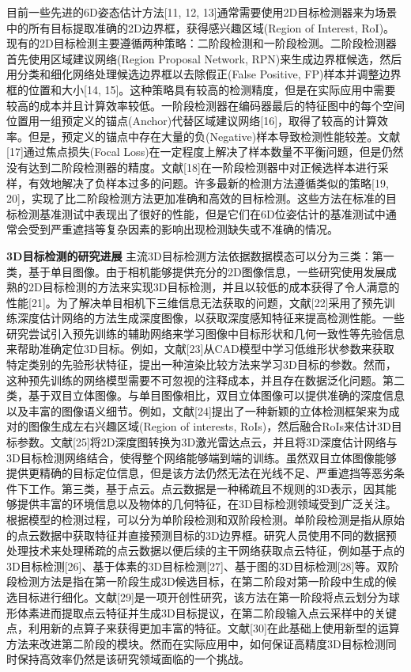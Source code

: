 \documentclass[12pt]{article}
\begin{document}
目前一些先进的6D姿态估计方法[11, 12, 13]通常需要使用2D目标检测器来为场景中的所有目标提取准确的2D边界框，获得感兴趣区域(Region of Interest, RoI)。现有的2D目标检测主要遵循两种策略：二阶段检测和一阶段检测。二阶段检测器首先使用区域建议网络(Region Proposal Network, RPN)来生成边界框候选，然后用分类和细化网络处理候选边界框以去除假正(False Positive, FP)样本并调整边界框的位置和大小[14, 15]。这种策略具有较高的检测精度，但是在实际应用中需要较高的成本并且计算效率较低。一阶段检测器在编码器最后的特征图中的每个空间位置用一组预定义的锚点(Anchor)代替区域建议网络[16]，取得了较高的计算效率。但是，预定义的锚点中存在大量的负(Negative)样本导致检测性能较差。文献[17]通过焦点损失(Focal Loss)在一定程度上解决了样本数量不平衡问题，但是仍然没有达到二阶段检测器的精度。文献[18]在一阶段检测器中对正候选样本进行采样，有效地解决了负样本过多的问题。许多最新的检测方法遵循类似的策略[19, 20]，实现了比二阶段检测方法更加准确和高效的目标检测。这些方法在标准的目标检测基准测试中表现出了很好的性能，但是它们在6D位姿估计的基准测试中通常会受到严重遮挡等复杂因素的影响出现检测缺失或不准确的情况。

\textbf{3D目标检测的研究进展}
主流3D目标检测方法依据数据模态可以分为三类：第一类，基于单目图像。由于相机能够提供充分的2D图像信息，一些研究使用发展成熟的2D目标检测的方法来实现3D目标检测，并且以较低的成本获得了令人满意的性能[21]。为了解决单目相机下三维信息无法获取的问题，文献[22]采用了预先训练深度估计网络的方法生成深度图像，以获取深度感知特征来提高检测性能。一些研究尝试引入预先训练的辅助网络来学习图像中目标形状和几何一致性等先验信息来帮助准确定位3D目标。例如，文献[23]从CAD模型中学习低维形状参数来获取特定类别的先验形状特征，提出一种渲染比较方法来学习3D目标的参数。然而，这种预先训练的网络模型需要不可忽视的注释成本，并且存在数据泛化问题。第二类，基于双目立体图像。与单目图像相比，双目立体图像可以提供准确的深度信息以及丰富的图像语义细节。例如，文献[24]提出了一种新颖的立体检测框架来为成对的图像生成左右兴趣区域(Region of interests, RoIs)，然后融合RoIs来估计3D目标参数。文献[25]将2D深度图转换为3D激光雷达点云，并且将3D深度估计网络与3D目标检测网络结合，使得整个网络能够端到端的训练。虽然双目立体图像能够提供更精确的目标定位信息，但是该方法仍然无法在光线不足、严重遮挡等恶劣条件下工作。第三类，基于点云。点云数据是一种稀疏且不规则的3D表示，因其能够提供丰富的环境信息以及物体的几何特征，在3D目标检测领域受到广泛关注。根据模型的检测过程，可以分为单阶段检测和双阶段检测。单阶段检测是指从原始的点云数据中获取特征并直接预测目标的3D边界框。研究人员使用不同的数据预处理技术来处理稀疏的点云数据以便后续的主干网络获取点云特征，例如基于点的3D目标检测[26]、基于体素的3D目标检测[27]、基于图的3D目标检测[28]等。双阶段检测方法是指在第一阶段生成3D候选目标，在第二阶段对第一阶段中生成的候选目标进行细化。文献[29]是一项开创性研究，该方法在第一阶段将点云划分为球形体素进而提取点云特征并生成3D目标提议，在第二阶段输入点云采样中的关键点，利用新的点算子来获得更加丰富的特征。文献[30]在此基础上使用新型的运算方法来改进第二阶段的模块。然而在实际应用中，如何保证高精度3D目标检测同时保持高效率仍然是该研究领域面临的一个挑战。
\end{document}
